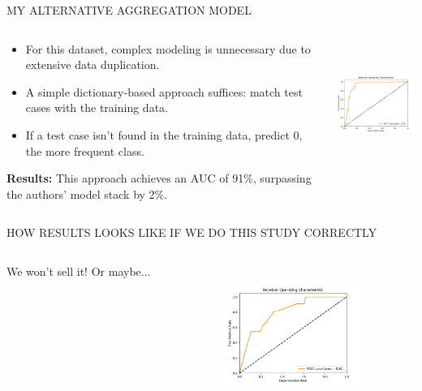 \documentclass[11pt, aspectratio=169]{beamer}
\begin{document}
\begin{frame}{\MakeUppercase{My alternative aggregation model}}
    \begin{columns}[c]
        \begin{column}{.7\textwidth}
            \begin{itemize}
                \itemsep1em
                \item For this dataset, complex modeling is unnecessary due to extensive data duplication.
                \item A simple dictionary-based approach suffices: match test cases with the training data.
                \item If a test case isn't found in the training data, predict 0, the more frequent class.
            \end{itemize}

            \textbf{Results:} This approach achieves an AUC of 91\%, surpassing the authors' model stack by 2\%.
        \end{column}
        \begin{column}{.3\textwidth}
            \includegraphics[width=4cm,height=4cm]{output/fake_model_roc_curve}
        \end{column}
    \end{columns}
\end{frame}


\begin{frame}{\MakeUppercase{How results looks like if we do this study correctly}}

\begin{columns}[c]
    \begin{column}{.5\textwidth}
        We won't sell it! Or maybe...
    \end{column}
    \begin{column}{.5\textwidth}
        \includegraphics[width=4.5cm,height=4.5cm]{output/alternative_roc_curve}
    \end{column}
\end{columns}

\end{frame}
\end{document}
